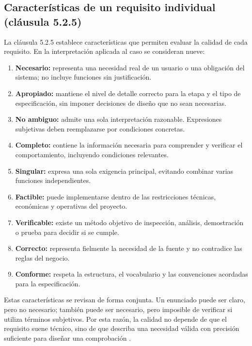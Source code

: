 \documentclass[11pt,a4paper]{article}
\begin{document}
\subsection{Características de un requisito individual (cláusula 5.2.5)}
La cláusula 5.2.5 establece características que permiten evaluar la calidad de cada requisito. En la interpretación aplicada al caso se consideran nueve:
\begin{enumerate}[leftmargin=*]
  \item \textbf{Necesario:} representa una necesidad real de un usuario o una obligación del sistema; no incluye funciones sin justificación.
  \item \textbf{Apropiado:} mantiene el nivel de detalle correcto para la etapa y el tipo de especificación, sin imponer decisiones de diseño que no sean necesarias.
  \item \textbf{No ambiguo:} admite una sola interpretación razonable. Expresiones subjetivas deben reemplazarse por condiciones concretas.
  \item \textbf{Completo:} contiene la información necesaria para comprender y verificar el comportamiento, incluyendo condiciones relevantes.
  \item \textbf{Singular:} expresa una sola exigencia principal, evitando combinar varias funciones independientes.
  \item \textbf{Factible:} puede implementarse dentro de las restricciones técnicas, económicas y operativas del proyecto.
  \item \textbf{Verificable:} existe un método objetivo de inspección, análisis, demostración o prueba para decidir si se cumple.
  \item \textbf{Correcto:} representa fielmente la necesidad de la fuente y no contradice las reglas del negocio.
  \item \textbf{Conforme:} respeta la estructura, el vocabulario y las convenciones acordadas para la especificación.
\end{enumerate}
Estas características se revisan de forma conjunta. Un enunciado puede ser claro, pero no necesario; también puede ser necesario, pero imposible de verificar si utiliza términos subjetivos. Por esta razón, la calidad no depende de que el requisito suene técnico, sino de que describa una necesidad válida con precisión suficiente para diseñar una comprobación \cite{iso29148,pohl2025}.
\end{document}
